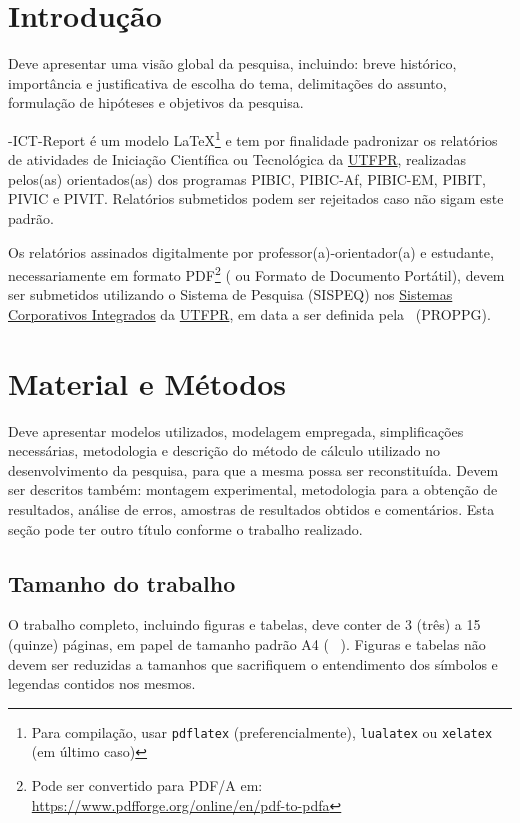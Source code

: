 \documentclass[%
  a4paper,%
  12pt,%
  fleqn,%
  english,%
  brazilian,%
]{article}
\begin{document}
\section{Introdução}%
\label{sect:intro}

Deve apresentar uma visão global da pesquisa, incluindo: breve histórico, importância e justificativa de escolha do tema, delimitações do assunto, formulação de hipóteses e objetivos da pesquisa.

\UTFPR-ICT-Report é um modelo \LaTeX\footnote{Para compilação, usar \texttt{pdflatex} (preferencialmente), \texttt{lualatex} ou \texttt{xelatex} (em último caso)} e tem por finalidade padronizar os relatórios de atividades de Iniciação Científica ou Tecnológica da \href{https://www.utfpr.edu.br/}{UTFPR\LinkIcon}, realizadas pelos{(as)} orientados{(as)} dos programas PIBIC, PIBIC-Af, PIBIC-EM, PIBIT, PIVIC e PIVIT\@.
Relatórios submetidos podem ser rejeitados caso não sigam este padrão.

Os relatórios assinados digitalmente por professor{(a)}-orientador{(a)} e estudante, necessariamente em formato PDF\footnote{Pode ser convertido para PDF/A em: \url{https://www.pdfforge.org/online/en/pdf-to-pdfa}} ( ou Formato de Documento Portátil), devem ser submetidos utilizando o Sistema de Pesquisa (SISPEQ) nos \href{https://sistemas2.utfpr.edu.br/}{Sistemas Corporativos Integrados\LinkIcon} da \href{https://www.utfpr.edu.br/}{UTFPR\LinkIcon}, em data a ser definida pela \PROPPGName\ (PROPPG).

\section{Material e Métodos}%
\label{sect:mat-meth}

Deve apresentar modelos utilizados, modelagem empregada, simplificações necessárias, metodologia e descrição do método de cálculo utilizado no desenvolvimento da pesquisa, para que a mesma possa ser reconstituída.
Devem ser descritos também: montagem experimental, metodologia para a obtenção de resultados, análise de erros, amostras de resultados obtidos e comentários.
Esta seção pode ter outro título conforme o trabalho realizado.

\subsection{Tamanho do trabalho}%
\label{ssect:work-size}

O trabalho completo, incluindo figuras e tabelas, deve conter de 3 (três) a 15 (quinze) páginas, em papel de tamanho padrão A4 ( \texttimes\ ).
Figuras e tabelas não devem ser reduzidas a tamanhos que sacrifiquem o entendimento dos símbolos e legendas contidos nos mesmos.
\end{document}
